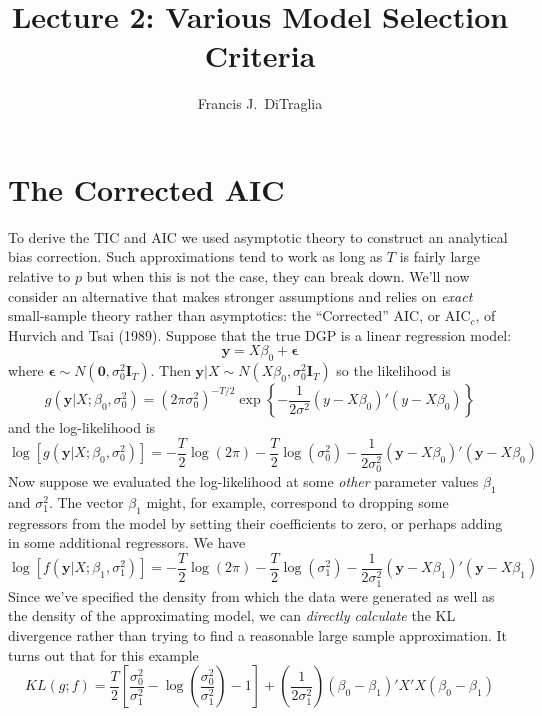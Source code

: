 \documentclass[12pt]{article}
\theoremstyle{definition}
\begin{document}
\title{Lecture 2: Various Model Selection Criteria}

\author{Francis J.\ DiTraglia}

\maketitle 


\section{The Corrected AIC}
To derive the TIC and AIC we used asymptotic theory to construct an analytical bias correction. Such approximations tend to work as long as $T$ is fairly large relative to $p$ but when this is not the case, they can break down. We'll now consider an alternative that makes stronger assumptions and relies on \emph{exact} small-sample theory rather than asymptotics: the ``Corrected'' AIC, or AIC$
_c$, of Hurvich and Tsai (1989). Suppose that the true DGP is a linear regression model:
$$\textbf{y} = X\beta_0 + \boldsymbol{\epsilon}$$
where $\mathbf{\epsilon} \sim N(\mathbf{0}, \sigma_0^2 \mathbf{I}_T)$. Then $\mathbf{y}|X \sim N(X\beta_0, \sigma_0^2 \mathbf{I}_T)$ so the likelihood is
$$g(\textbf{y}|X;\beta_0, \sigma^2_0) = \left(2\pi\sigma_0^2\right)^{-T/2} \exp\left\{ -\frac{1}{2\sigma^2}(y - X\beta_0)'(y - X\beta_0)\right\}$$
and the log-likelihood is
$$\log\left[g(\textbf{y}|X;\beta_0, \sigma_0^2)\right] = -\frac{T}{2}\log(2\pi) -\frac{T}{2} \log(\sigma^2_0) - \frac{1}{2\sigma_0^2}\left(\textbf{y} - X\beta_0\right)'\left(\textbf{y} -X\beta_0\right)$$
Now suppose we evaluated the log-likelihood at some \emph{other} parameter values $\beta_1$ and $\sigma^2_1$. The vector $\beta_1$ might, for example, correspond to dropping some regressors from the model by setting their coefficients to zero, or perhaps adding in some additional regressors. We have
$$\log[f(\textbf{y}|X;\beta_1, \sigma_1^2)] = -\frac{T}{2}\log(2\pi) -\frac{T}{2} \log(\sigma^2_1) - \frac{1}{2\sigma_1^2}\left(\textbf{y} - X\beta_1\right)'\left(\textbf{y} -X\beta_1\right)$$
Since we've specified the density from which the data were generated as well as the density of the approximating model, we can \emph{directly calculate} the KL divergence rather than trying to find a reasonable large sample approximation. It turns out that for this example 
$$KL(g;f) = \frac{T}{2}\left[\frac{\sigma_0^2}{\sigma_1^2} - \log\left(\frac{\sigma_0^2}{\sigma_1^2}\right) - 1 \right] + \left(\frac{1}{2 \sigma_1^2}\right)\left(\beta_0 - \beta_1\right)'X'X\left(\beta_0 - \beta_1\right)$$ 
\end{document}
